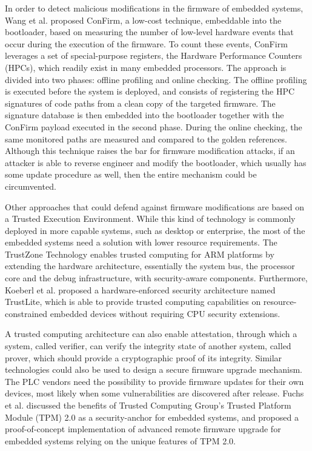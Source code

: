 In order to detect malicious modifications in the firmware of embedded systems, Wang et al. \cite{confirm} proposed ConFirm,
a low-cost technique, embeddable into the bootloader, based on measuring the number of low-level hardware events that occur during the execution of the firmware.
To count these events, ConFirm leverages a set of special-purpose registers, the Hardware Performance Counters (HPCs), which readily exist in many embedded processors.
The approach is divided into two phases: offline profiling and online checking. The offline profiling is executed before the system is deployed,
and consists of registering the HPC signatures of code paths from a clean copy of the targeted firmware. The signature database is then embedded into the bootloader
together with the ConFirm payload executed in the second phase. During the online checking, the same monitored paths are measured and compared to the golden references.
Although this technique raises the bar for firmware modification attacks, if an attacker is able to reverse engineer and modify the bootloader,
which usually has some update procedure as well, then the entire mechanism could be circumvented.

Other approaches that could defend against firmware modifications are based on a Trusted Execution Environment. While this kind of technology is commonly deployed
in more capable systems, such as desktop or enterprise, the most of the embedded systems need a solution with lower resource requirements.
The TrustZone Technology \cite{trustzone} enables trusted computing for ARM platforms by extending the hardware architecture,
essentially the system bus, the processor core and the debug infrastructure, with security-aware components.
Furthermore, Koeberl et al. \cite{trustlite} proposed a hardware-enforced security architecture named TrustLite, which is able to provide trusted computing capabilities
on resource-constrained embedded devices without requiring CPU security extensions.

A trusted computing architecture can also enable attestation, through which a system, called verifier, can verify the integrity state of another system, called prover,
which should provide a cryptographic proof of its integrity. Similar technologies could also be used to design a secure firmware upgrade mechanism.
The PLC vendors need the possibility to provide firmware updates for their own devices, most likely when some vulnerabilities are discovered after release.
Fuchs et al. \cite{tpm2} discussed the benefits of Trusted Computing Group's Trusted Platform Module (TPM) 2.0 as a security-anchor for embedded systems,
and proposed a proof-of-concept implementation of advanced remote firmware upgrade for embedded systems relying on the unique features of TPM 2.0.

